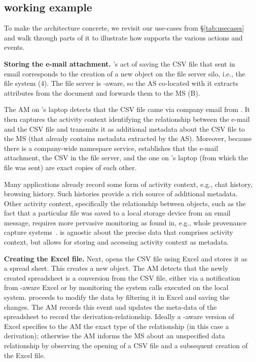\subsection{\emph{\system} working example}


To make the \emph{\system} architecture concrete, we revisit our use-cases from
\S\ref{tab:usecases} and walk through parts of it to illustrate how \emph{\system}
supports the various actions and events.

\noindent\textbf{Storing the e-mail attachment.}
\persa's act of saving the CSV file that \persc sent in email corresponds to the
creation of a new object on the file server silo, i.e., the file system (4). The
file server is \emph{\system}-aware, so the AS co-located with it extracts
attributes from the document and forwards them to the MS (B).

The AM on \persa's laptop detects that the CSV file came via company email from
\persc. It then captures the activity context identifying the relationship
between the e-mail and the CSV file and transmits it as additional metadata
about the CSV file to the MS (that already contains metadata extracted by the
AS). Moreover, because there is a company-wide namespace service, \emph{\system}
establishes that the e-mail attachment, the CSV in the file server, and the one
on \persc's laptop (from which the file was sent) are exact copies of each
other.

Many applications already record some form of activity context, e.g., chat
history, browsing history. Such histories provide a rich source of additional
metadata. Other activity context, specifically the relationship between objects,
such as the fact that a particular file was saved to a local storage device from
an email message, requires more pervasive monitoring as found in, e.g., whole
provenance capture systems~\cite{camflow}. \emph{\system} is agnostic about the precise
data that comprises activity context, but allows for storing and accessing
activity context as metadata.

\noindent\textbf{Creating the Excel file.}
Next, \persa opens the CSV file using Excel and stores it as a spread sheet.
This creates a new object. The AM detects that the newly created spreadsheet is
a conversion from the CSV file, either via a notification from \emph{\system}-aware
Excel or by monitoring the system calls executed on the local system. \persa
proceeds to modify the data by filtering it in Excel and saving the changes. The
AM records this event and updates the meta-data of the spreadsheet to record the
derivation-relationship. Ideally a \emph{\system}-aware version of Excel specifies to
the AM the exact type of the relationship (in this case a derivation); otherwise
the AM informs the MS about an unspecified data relationship by observing the
opening of a CSV file and a subsequent creation of the Excel file.

